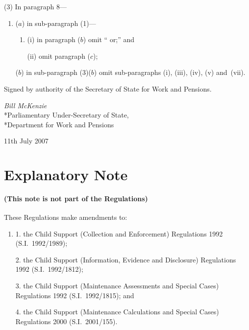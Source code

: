\documentclass[12pt,a4paper]{article}
\begin{document}
(3) In paragraph 8—
\begin{enumerate}\item[]
($a$) in sub-paragraph (1)—
\begin{enumerate}\item[]
(i) in paragraph ($b$)  omit “ or;” and

(ii) omit paragraph ($c$);
\end{enumerate}

($b$) in sub-paragraph (3)($b$)  omit sub-paragraphs (i), (iii), (iv), (v) and~(vii).
\end{enumerate}

\bigskip

Signed 
by authority of the 
Secretary of State for Work and Pensions.

{\raggedleft
\emph{Bill McKenzie}\\*Parliamentary Under-Secretary of State,\\*Department for Work and Pensions

}

11th July 2007

\small

\part{Explanatory Note}

\renewcommand\parthead{— Explanatory Note}

\subsection*{(This note is not part of the Regulations)}

These Regulations make amendments to:
\begin{enumerate}\item[]
1.  the Child Support (Collection and Enforcement) Regulations 1992 (S.I.\ 1992/1989);

2.  the Child Support (Information, Evidence and Disclosure) Regulations 1992 (S.I.\ 1992/1812);

3.  the Child Support (Maintenance Assessments and Special Cases) Regulations 1992 (S.I.\ 1992/1815); and

4.  the Child Support (Maintenance Calculations and Special Cases) Regulations 2000 (S.I.\ 2001/155).
\end{enumerate}
\end{document}
